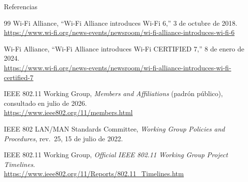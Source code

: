 \documentclass[aspectratio=169,10pt]{beamer}
\begin{document}
\begin{frame}[allowframebreaks]{Referencias}
\begin{thebibliography}{99}
     Wi-Fi Alliance, ``Wi-Fi Alliance introduces Wi-Fi 6,''
      3 de octubre de 2018.\\ \hspace*{0pt}\url{https://www.wi-fi.org/news-events/newsroom/wi-fi-alliance-introduces-wi-fi-6}

     Wi-Fi Alliance, ``Wi-Fi Alliance introduces Wi-Fi CERTIFIED 7,''
      8 de enero de 2024.\\ \hspace*{0pt}\url{https://www.wi-fi.org/news-events/newsroom/wi-fi-alliance-introduces-wi-fi-certified-7}

     IEEE 802.11 Working Group, \textit{Members and Affiliations}
      (padrón público), consultado en julio de 2026.\\ \hspace*{0pt}\url{https://www.ieee802.org/11/members.html}

     IEEE 802 LAN/MAN Standards Committee, \textit{Working Group Policies
      and Procedures}, rev.~25, 15 de julio de 2022.

     IEEE 802.11 Working Group, \textit{Official IEEE 802.11 Working
      Group Project Timelines}.\\ \hspace*{0pt}\url{https://www.ieee802.org/11/Reports/802.11_Timelines.htm}
  \end{thebibliography}
\end{frame}
\end{document}
